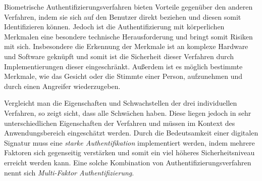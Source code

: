 \documentclass[11pt,a4paper,ngerman]{scrreprt}
\begin{document}
\begin{description}[font=\rmfamily]
    \item[Biometrie:] Biometrische Authentifizierungsverfahren bieten Vorteile gegenüber den anderen Verfahren, indem sie sich auf den Benutzer direkt beziehen und diesen somit Identifizieren können. Jedoch ist die Authentifizierung mit körperlichen Merkmalen eine besondere technische Herausforderung und bringt somit Risiken mit sich. Insbesondere die Erkennung der Merkmale ist an komplexe Hardware und Software geknüpft und somit ist die Sicherheit dieser Verfahren durch Implementierungen dieser eingeschränkt. Außerdem ist es möglich bestimmte Merkmale, wie das Gesicht oder die Stimmte einer Person, aufzunehmen und durch einen Angreifer wiederzugeben.
\end{description}
Vergleicht man die Eigenschaften und Schwachstellen der drei individuellen Verfahren, so zeigt sicht, dass alle Schwächen haben. Diese liegen jedoch in sehr unterschiedlichen Eigenschaften der Verfahren und müssen im Kontext des Anwendungsbereich eingeschätzt werden. Durch die Bedeutsamkeit einer digitalen Signatur muss eine \emph{starke Authentifikation} implementiert werden, indem mehrere Faktoren sich gegenseitig verstärken und somit ein viel höheres Sicherheitsniveau erreicht werden kann. Eine solche Kombination von Authentifizierungsverfahren nennt sich \emph{Multi-Faktor Authentifizierung}.
\end{document}
